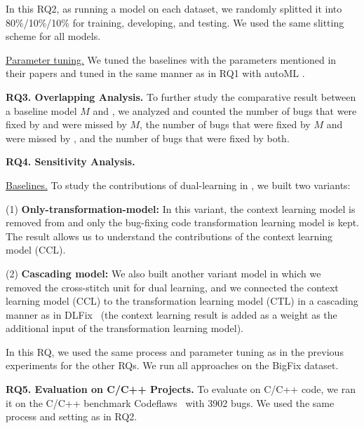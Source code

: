 
In this RQ2, as running a model on each dataset, we randomly splitted
it into 80\%/10\%/10\% for training, developing, and testing. We used
the same slitting scheme for all models.


\underline{Parameter tuning.} We tuned the baselines with the
parameters mentioned in their papers and tuned {\tool} in the same
manner as in RQ1 with autoML \cite{NNI}.

{\bf RQ3. Overlapping Analysis.} To further study the comparative
result between a baseline model $M$ and {\tool}, we analyzed and
counted the number of bugs that were fixed by {\tool} and were missed
by $M$, the number of bugs that were fixed by $M$ and were missed
by {\tool}, and the number of bugs that were fixed by both.


{\bf RQ4. Sensitivity Analysis.}

\underline{Baselines.} To study the contributions of dual-learning in
{\tool}, we built two variants:

(1) \textbf{Only-transformation-model:} In this variant, the
context learning model is removed from {\tool} and only the bug-fixing
code transformation learning model is kept. The result allows us to
understand the contributions of the context learning model (CCL).


(2) \textbf{Cascading model:} We also built another variant model in
which we removed the cross-stitch unit for dual learning, and we
connected the context learning model (CCL) to the transformation
learning model (CTL) in a cascading manner as in DLFix~\cite{icse20}
(the context learning result is added as a weight
as the additional input of the transformation learning model).


In this RQ, we used the same process and parameter tuning as in the
previous experiments for the other RQs. We run all approaches on the BigFix dataset.


{\bf RQ5. Evaluation on C/C++ Projects.}  To evaluate {\tool} on C/C++
code, we ran it on the C/C++ benchmark
Codeflaws~\cite{tan2017codeflaws} with 3902 bugs. 
We used the same process and setting as in RQ2.

